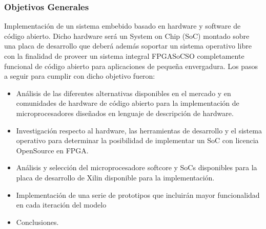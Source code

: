 \documentclass[xcolor=dvipsnames,mathserif,9pt]{beamer}
\begin{document}
  \begin{frame}  
\frametitle{Objetivos  Generales} Implementación de un sistema embebido basado en hardware y software de código abierto.%
Dicho hardware será un System on Chip (SoC) montado sobre una placa de desarrollo  que deberá además soportar un sistema operativo
libre con la finalidad de proveer un sistema integral FPGA\-SoC\-SO completamente funcional de código abierto para aplicaciones de pequeña envergadura. Los pasos  a seguir para cumplir con dicho objetivo fueron:
    \begin{itemize}\itemsep=0.25cm
	\item Análisis de las diferentes alternativas disponibles en el mercado y en comunidades de hardware de código abierto para la implementación de microprocesadores diseñados en lenguaje de descripción de hardware.
      \item Investigación respecto al hardware, las herramientas de desarrollo y el sistema operativo para determinar la posibilidad de implementar un SoC con licencia OpenSource en FPGA.
	\item Análisis y selección del microprocesadore softcore y SoCs disponibles para la placa de desarrollo de Xilin disponible para la implementación.
	\item Implementación de una serie de prototipos que incluirán mayor funcionalidad en cada iteración del modelo 
    \item Conclusiones.
    \end{itemize}
%    
  \end{frame}
%  
\end{document}
